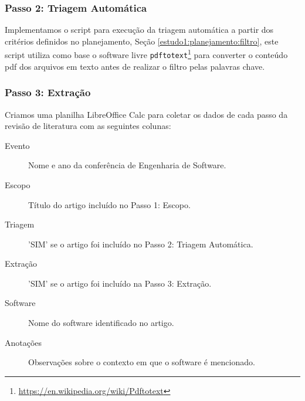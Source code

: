 \subsubsection{Passo 2: Triagem Automática}



Implementamos o script para execução da triagem automática a partir dos
critérios definidos no planejamento, Seção \ref{estudo1:planejamento:filtro},
este script utiliza como base o software livre
\texttt{pdftotext}\footnote{\url{https://en.wikipedia.org/wiki/Pdftotext}} para
converter o conteúdo pdf dos arquivos em texto antes de realizar o filtro pelas
palavras chave.

\subsubsection{Passo 3: Extração}

Criamos uma planilha LibreOffice Calc para coletar os dados de cada passo da
revisão de literatura com as seguintes colunas:

\begin{description}
  \item[Evento] Nome e ano da conferência de Engenharia de Software.
  \item[Escopo] Título do artigo incluído no Passo 1: Escopo.
  \item[Triagem] 'SIM' se o artigo foi incluído no Passo 2: Triagem Automática.
  \item[Extração] 'SIM' se o artigo foi incluído na Passo 3: Extração.
  \item[Software] Nome do software identificado no artigo.
  \item[Anotações] Observações sobre o contexto em que o software é mencionado.
\end{description}


